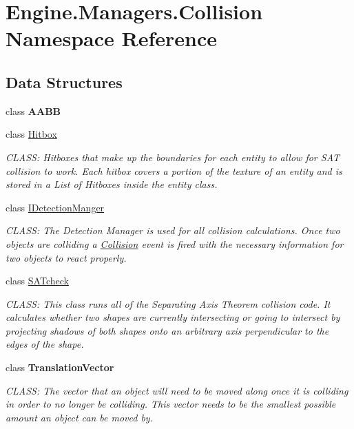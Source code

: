 \hypertarget{a00268}{}\section{Engine.\+Managers.\+Collision Namespace Reference}
\label{a00268}
\subsection*{Data Structures}
\begin{DoxyCompactItemize}
\item 
class {\bfseries A\+A\+BB}
\item 
class \hyperlink{a00506}{Hitbox}
\begin{DoxyCompactList}\small\item\em C\+L\+A\+SS\+: Hitboxes that make up the boundaries for each entity to allow for S\+AT collision to work. Each hitbox covers a portion of the texture of an entity and is stored in a List of Hitboxes inside the entity class. \end{DoxyCompactList}\item 
class \hyperlink{a00502}{I\+Detection\+Manger}
\begin{DoxyCompactList}\small\item\em C\+L\+A\+SS\+: The Detection Manager is used for all collision calculations. Once two objects are colliding a \hyperlink{a00268}{Collision} event is fired with the necessary information for two objects to react properly. \end{DoxyCompactList}\item 
class \hyperlink{a00510}{S\+A\+Tcheck}
\begin{DoxyCompactList}\small\item\em C\+L\+A\+SS\+: This class runs all of the Separating Axis Theorem collision code. It calculates whether two shapes are currently intersecting or going to intersect by projecting shadows of both shapes onto an arbitrary axis perpendicular to the edges of the shape. \end{DoxyCompactList}\item 
class {\bfseries Translation\+Vector}
\begin{DoxyCompactList}\small\item\em C\+L\+A\+SS\+: The vector that an object will need to be moved along once it is colliding in order to no longer be colliding. This vector needs to be the smallest possible amount an object can be moved by. \end{DoxyCompactList}\end{DoxyCompactItemize}
